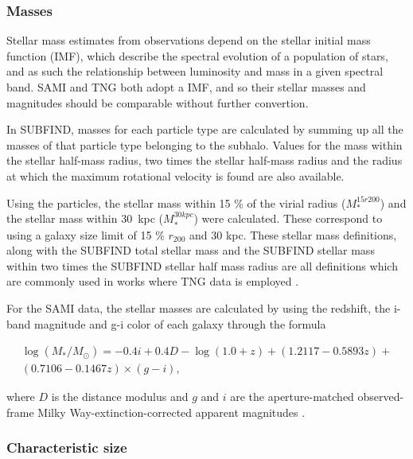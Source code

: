 \subsubsection{Masses}

Stellar mass estimates from observations depend on the stellar initial mass function (IMF), which describe the spectral evolution of a population of stars, and as such the relationship between luminosity and mass in a given spectral band. SAMI and TNG both adopt a \textcite{Chabrier2003} IMF, and so their stellar masses and magnitudes should be comparable without further convertion.

In SUBFIND, masses for each particle type are calculated by summing up all the masses of that particle type belonging to the subhalo. Values for the mass within the stellar half-mass radius, two times the stellar half-mass radius and the radius at which the maximum rotational velocity is found are also available.

Using the particles, the stellar mass within 15 \% of the virial radius ($M_\ast^{15r200}$) and the stellar mass within 30$\,$ kpc ($M_\ast^{30kpc}$) were calculated. These correspond to using a galaxy size limit of 15 \% $r_{200}$ and 30 kpc. These stellar mass definitions, along with the SUBFIND total stellar mass and the SUBFIND stellar mass within two times the SUBFIND stellar half mass radius are all definitions which are commonly used in works where TNG data is employed \parencite[see e.g.,][]{Vazquez2020, Ferrero2020, Lu2020, Rodriguez2020}.

For the SAMI data, the stellar masses are calculated by using the redshift, the i-band magnitude and g-i color of each galaxy through the formula 

\begin{equation}
	\begin{split}
		\log(M_*/M_\odot) = -0.4i + 0.4D - \log(1.0+z) + (1.2117 - 0.5893z) + \\
		 (0.7106 - 0.1467z) \times (g-i), 
	\end{split}
\end{equation}

where $D$ is the distance modulus and $g$ and $i$ are the aperture-matched observed-frame Milky Way-extinction-corrected apparent magnitudes \parencite{Bryant2015}.

\subsubsection{Characteristic size}\label{charsize}

